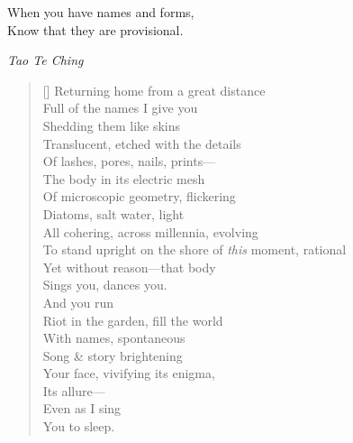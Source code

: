 \epigraph{When you have names and forms,\\ Know that they are provisional.}{\textit{Tao Te Ching}}

\label{ch:child}
\settowidth{\versewidth}{To stand upright on the shore of this moment, rational}
\begin{verse}[\versewidth]
Returning home from a great distance\\
Full of the names I give you\\
Shedding them like skins\\
Translucent, etched with the details\\
Of lashes, pores, nails, prints---\\
The body in its electric mesh\\
Of microscopic geometry, flickering\\
Diatoms, salt water, light\\
All cohering, across millennia, evolving\\
To stand upright on the shore of \textit{this} moment, rational\\
Yet without reason---that body\\
Sings you, dances you.\\
\hspace*{4\vgap} And you run\\
Riot in the garden, fill the world\\
With names, spontaneous\\
Song \& story brightening \\
Your face, vivifying its enigma,\\
Its allure---\\
\hspace*{3\vgap} Even as I sing\\
You to sleep.
\end{verse}
